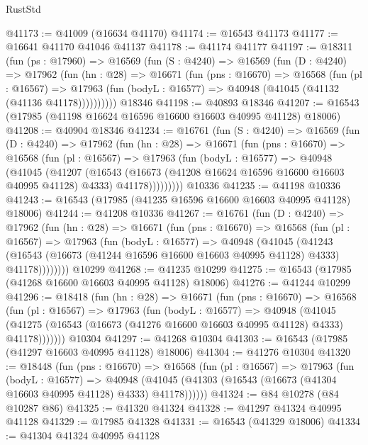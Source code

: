 \begin{lexlean}{RustStd}
\begin{coremodule}
@41173 := @41009 (@16634 @41170)
@41174 := @16543 @41173
@41177 := @16641 @41170 @41046 @41137
@41178 := @41174 @41177
@41197 := @18311
    (fun (ps : @17960) =>
    @16569
      (fun (S : @4240) =>
      @16569
        (fun (D : @4240) =>
        @17962
          (fun (hn : @28) =>
          @16671
            (fun (pns : @16670) =>
            @16568
              (fun (pl : @16567) =>
              @17963 (fun (bodyL : @16577) => @40948 (@41045 (@41132 (@41136 @41178))))))))))
    @18346
@41198 := @40893 @18346
@41207 := @16543 (@17985 (@41198 @16624 @16596 @16600 @16603 @40995 @41128) @18006)
@41208 := @40904 @18346
@41234 := @16761
    (fun (S : @4240) =>
    @16569
      (fun (D : @4240) =>
      @17962
        (fun (hn : @28) =>
        @16671
          (fun (pns : @16670) =>
          @16568
            (fun (pl : @16567) =>
            @17963
              (fun (bodyL : @16577) =>
              @40948
                (@41045
                  (@41207
                    (@16543
                      (@16673 (@41208 @16624 @16596 @16600 @16603 @40995 @41128) @4333)
                      @41178)))))))))
    @10336
@41235 := @41198 @10336
@41243 := @16543 (@17985 (@41235 @16596 @16600 @16603 @40995 @41128) @18006)
@41244 := @41208 @10336
@41267 := @16761
    (fun (D : @4240) =>
    @17962
      (fun (hn : @28) =>
      @16671
        (fun (pns : @16670) =>
        @16568
          (fun (pl : @16567) =>
          @17963
            (fun (bodyL : @16577) =>
            @40948
              (@41045
                (@41243
                  (@16543 (@16673 (@41244 @16596 @16600 @16603 @40995 @41128) @4333) @41178))))))))
    @10299
@41268 := @41235 @10299
@41275 := @16543 (@17985 (@41268 @16600 @16603 @40995 @41128) @18006)
@41276 := @41244 @10299
@41296 := @18418
    (fun (hn : @28) =>
    @16671
      (fun (pns : @16670) =>
      @16568
        (fun (pl : @16567) =>
        @17963
          (fun (bodyL : @16577) =>
          @40948
            (@41045
              (@41275 (@16543 (@16673 (@41276 @16600 @16603 @40995 @41128) @4333) @41178)))))))
    @10304
@41297 := @41268 @10304
@41303 := @16543 (@17985 (@41297 @16603 @40995 @41128) @18006)
@41304 := @41276 @10304
@41320 := @18448
    (fun (pns : @16670) =>
    @16568
      (fun (pl : @16567) =>
      @17963
        (fun (bodyL : @16577) =>
        @40948 (@41045 (@41303 (@16543 (@16673 (@41304 @16603 @40995 @41128) @4333) @41178))))))
@41324 := @84 @10278 (@84 @10287 @86)
@41325 := @41320 @41324
@41328 := @41297 @41324 @40995 @41128
@41329 := @17985 @41328
@41331 := @16543 (@41329 @18006)
@41334 := @41304 @41324 @40995 @41128

\end{coremodule}
\end{lexlean}
